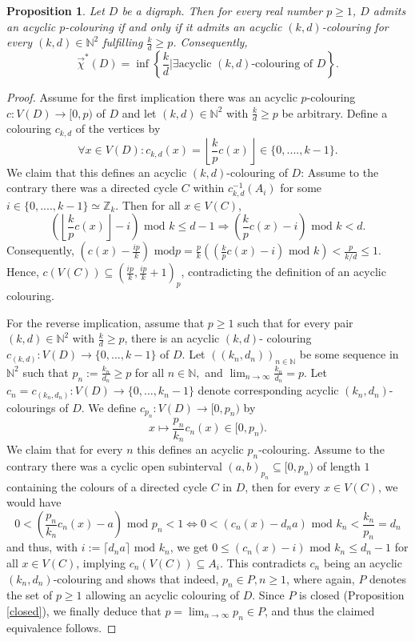 \documentclass[fontsize=11pt,a4paper,DIV12]{scrartcl}
\theoremstyle{meiner}
\newtheorem{proposition}{Proposition}
\theoremstyle{definition}
\begin{document}
\begin{proposition} \label{zshg} Let $D$ be a digraph. Then for every real
  number $p \ge 1$, $D$ admits an acyclic $p$-colouring if and only if
  it admits an acyclic $(k,d)$-colouring for every $(k,d) \in
  \mathbb{N}^2$ fulfilling $\frac{k}{d} \ge p$. Consequently,
$$\vec{\chi}^\ast(D)=\inf\left\{\frac{k}{d}\bigg\vert\exists \text{acyclic } (k,d)\text{-colouring of }D\right\}.$$
\end{proposition}
\begin{proof}
Assume for the first implication there was an acyclic $p$-colouring $c:V(D) \rightarrow [0,p)$ of $D$ and let $(k,d) \in \mathbb{N}^2$ with $\frac{k}{d} \ge p$ be arbitrary. Define a colouring $c_{k,d}$ of the vertices by
$$\forall x \in V(D): c_{k,d}(x)=\left\lfloor \frac{k}{p}c(x) \right\rfloor \in \{0,....,k-1\}.$$
We claim that this defines an acyclic $(k,d)$-colouring of $D$: Assume
to the contrary there was a directed cycle $C$ within
$c_{k,d}^{-1}(A_i)$ for some $i \in \{0,....,k-1\} \simeq
\mathbb{Z}_k$. Then for all $x \in V(C)$, $$\left(\left\lfloor
    \frac{k}{p}c(x) \right\rfloor-i\right) \text{ mod }k \leq d-1
\Rightarrow \left(\frac{k}{p}c(x)-i\right) \text{ mod }k<d.$$
Consequently, $(c(x)-\frac{ip}{k}) \text{ mod
}p=\frac{p}{k}((\frac{k}{p}c(x)-i) \text{ mod }k) <\frac{p}{k/d} \leq
1$. Hence, $c(V(C)) \subseteq (\frac{ip}{k},\frac{ip}{k}+1)_p$,
contradicting the definition of an acyclic colouring. 

For the reverse implication, assume that $p \ge 1$ such that for every
pair $(k,d) \in \mathbb{N}^2$ with $\frac{k}{d} \ge p$, there is an
acyclic $(k,d)$- colouring $c_{(k,d)}:V(D) \rightarrow \{0,...,k-1\}$
of $D$.  Let $\left((k_n,d_n)\right)_{n \in \mathbb{N}}$ be some
sequence in $\mathbb{N}^2$ such that $p_n:=\frac{k_n}{d_n} \ge p$ for
all $n \in \mathbb{N},$ and $\lim_{n \to \infty}\frac{k_n}{d_n}=p$.
Let $c_n=c_{(k_n,d_n)}:V(D) \to \{0,\ldots,k_n-1\}$ denote
corresponding acyclic $(k_n,d_n)$-colourings of $D$. We define
$c_{p_n}:V(D) \rightarrow [0,p_n)$ by
$$x\mapsto \frac{p_n}{k_n}c_n(x) \in [0,p_n).$$ 
We claim that for every $n$ this defines an acyclic $p_n$-colouring.
Assume to the contrary there was a cyclic open subinterval
$(a,b)_{p_n} \subseteq [0,p_n)$ of length $1$ containing the colours
of a directed cycle $C$ in $D$, then for every $x \in V(C)$, we would
have $$0<\left(\frac{p_n}{k_n}c_n(x)-a\right) \text{ mod }p_n<1
\Leftrightarrow 0<(c_n(x)-d_na) \text{ mod }k_n<\frac{k_n}{p_n}=d_n$$
and thus, with $i:=\lceil d_na \rceil \text{ mod }k_n$, we get $0 \leq
(c_n(x)-i) \text{ mod }k_n \leq d_n-1$ for all $x \in V(C)$, implying
$c_n(V(C)) \subseteq A_i$. This contradicts $c_n$ being an acyclic
$(k_n,d_n)$-colouring and shows that indeed, $p_n \in P, n \ge 1$,
where again, $P$ denotes the set of $p \ge 1$ allowing an acyclic
colouring of $D$. Since $P$ is closed (Proposition \ref{closed}), we
finally deduce that $p=\lim_{n \rightarrow \infty}{p_n} \in P$, and
thus the claimed equivalence follows.
\end{proof}
\end{document}
